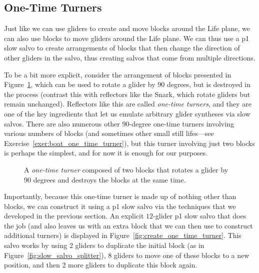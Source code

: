 \subsection{One-Time Turners}\label{sec:slow_salvo_turners}

Just like we can use gliders to create and move blocks around the Life plane, we can also use blocks to move gliders around the Life plane. We can thus use a p1 slow salvo to create arrangements of blocks that then change the direction of other gliders in the salvo, thus creating salvos that come from multiple directions.

To be a bit more explicit, consider the arrangement of blocks presented in Figure~\ref{fig:one_time_turner}, which can be used to rotate a glider by 90 degrees, but is destroyed in the process (contrast this with reflectors like the Snark, which rotate gliders but remain unchanged). Reflectors like this are called \emph{one-time turners}, and they are one of the key ingredients that let us emulate arbitrary glider syntheses via slow salvos. There are also numerous other 90-degree one-time turners involving various numbers of blocks (and sometimes other small still lifes---see Exercise~\ref{exer:boat_one_time_turner}), but this turner involving just two blocks is perhaps the simplest, and for now it is enough for our purposes.

\begin{figure}[!htb]
	\centering{}
	\caption{A \emph{one-time turner} composed of two blocks that rotates a glider by 90 degrees and destroys the blocks at the same time.}\label{fig:one_time_turner}
\end{figure}

Importantly, because this one-time turner is made up of nothing other than blocks, we can construct it using a p1 slow salvo via the techniques that we developed in the previous section. An explicit $12$-glider p1 slow salvo that does the job (and also leaves us with an extra block that we can then use to construct additional turners) is displayed in Figure~\ref{fig:create_one_time_turner}. This salvo works by using 2 gliders to duplicate the initial block (as in Figure~\ref{fig:slow_salvo_splitter}), 8 gliders to move one of these blocks to a new position, and then 2 more gliders to duplicate this block again.%

